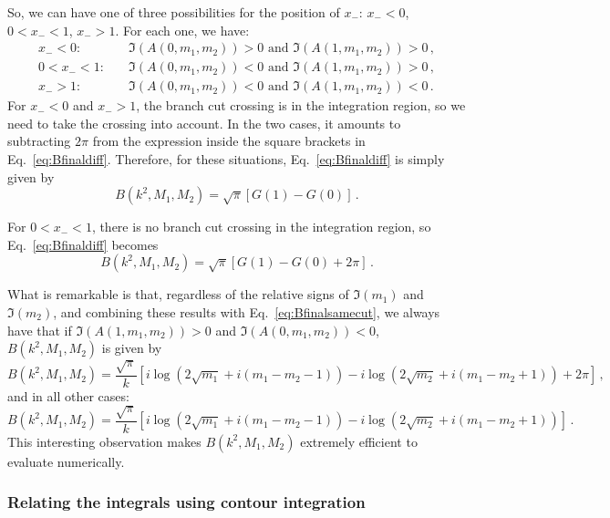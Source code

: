\documentclass[twoside]{article}
\begin{document}
\begin{itemize}
So, we can have one of three possibilities for the position of $x_-$: $x_- < 0$, $0 < x_- < 1$, $x_- > 1$. For each one, we have:
\begin{align*}
x_- < 0: &\quad \Im\left(A\left(0, m_1, m_2\right)\right) > 0 \text{ and } \Im\left(A\left(1, m_1, m_2\right)\right) > 0\,, \\
0 < x_- < 1: &\quad \Im\left(A\left(0, m_1, m_2\right)\right) < 0 \text{ and } \Im\left(A\left(1, m_1, m_2\right)\right) > 0 \,,\\
x_- > 1: &\quad \Im\left(A\left(0, m_1, m_2\right)\right) < 0 \text{ and } \Im\left(A\left(1, m_1, m_2\right)\right) < 0 \,.
\end{align*}
For $x_- < 0$ and $x_- > 1$, the branch cut crossing is in the integration region, so we need to take the crossing into account. In the two cases, it amounts to subtracting $2\pi$ from the expression inside the square brackets in Eq.~\eqref{eq:Bfinaldiff}. Therefore, for these situations, Eq.~\eqref{eq:Bfinaldiff} is simply given by 
\begin{equation}
B(k^2,M_1,M_2) = \sqrt{\pi}\left[G(1) - G(0)\right]\,.
\end{equation}

For $0 < x_- < 1$, there is no branch cut crossing in the integration region, so Eq.~\eqref{eq:Bfinaldiff} becomes
\begin{equation}
B(k^2,M_1,M_2) = \sqrt{\pi}\left[G(1) - G(0) + 2\pi\right]\,.
\end{equation}
\end{itemize}
What is remarkable is that, regardless of the relative signs of $\Im(m_1)$ and $\Im(m_2)$, and combining these results with Eq.~\eqref{eq:Bfinalsamecut}, we always have that if $\Im(A(1,m_1,m_2)) > 0$ and $\Im(A(0,m_1,m_2)) < 0$, $B(k^2,M_1,M_2)$ is given by
\begin{equation}
\label{eq:Bfinalcut}
B(k^2,M_1,M_2) =\frac{\sqrt{\pi}}{k} \left[i \log \left(2 \sqrt{m_1}+i (m_1-m_2-1)\right)-i \log \left(2 \sqrt{m_2}+i (m_1-m_2+1)\right) + 2\pi \right]\,,
\end{equation}
and in all other cases:
\begin{equation}
\label{eq:Bfinal}
B(k^2,M_1,M_2) =\frac{\sqrt{\pi}}{k} \left[i \log \left(2 \sqrt{m_1}+i (m_1-m_2-1)\right)-i \log \left(2 \sqrt{m_2}+i (m_1-m_2+1)\right)\right]\,.
\end{equation}
This interesting observation makes $B(k^2,M_1,M_2)$ extremely efficient to evaluate numerically.

\subsubsection{Relating the integrals using contour integration}
\end{document}
